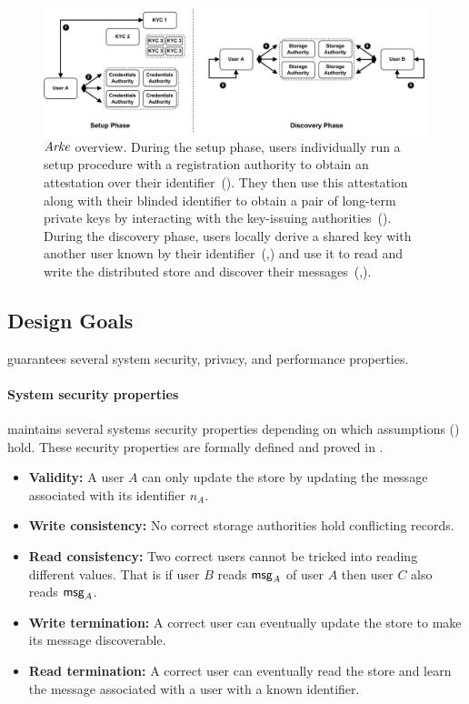 \begin{figure}[t]
    \centering
    \includegraphics[width=\textwidth]{figures/arke-overview.drawio.pdf}
    \caption{
        $\textit{Arke}$ overview. During the setup phase, users individually run a setup procedure with a registration authority to obtain an attestation over their identifier~(\one). They then use this attestation along with their blinded identifier to obtain a pair of long-term private keys by interacting with the key-issuing authorities~(\two). During the discovery phase, users locally derive a shared key with another user known by their identifier~(\three,\five) and use it to read and write the \sysname distributed store and discover their messages~(\four,\six).
    }
    \label{fig:arke-overview}
    \Description{}
\end{figure}

\subsection{Design Goals} \label{sec:properties}
\sysname guarantees several system security, privacy, and performance properties.

\paragraph{System security properties}
\sysname maintains several systems security properties depending on which assumptions () hold. These security properties are formally defined and proved in .
\begin{itemize}
    \item \textbf{Validity:} A user $A$ can only update the \sysname store by updating the message associated with its identifier $n_A$.
    \item \textbf{Write consistency:} No correct storage authorities hold conflicting records.
    \item \textbf{Read consistency:} Two correct users cannot be tricked into reading different values. That is if user $B$ reads $\mathsf{msg}_A$ of user $A$ then user $C$ also reads $\mathsf{msg}_A$.
    \item \textbf{Write termination:} A correct user can eventually update the store to make its message discoverable.
    \item \textbf{Read termination:} A correct user can eventually read the store and learn the message associated with a user with a known identifier.
\end{itemize}

